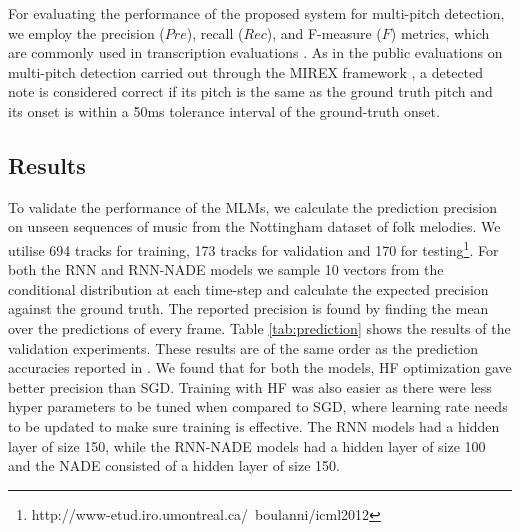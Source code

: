 For evaluating the performance of the proposed system for multi-pitch detection, we employ the precision ($\mathit{Pre}$), recall ($\mathit{Rec}$), and F-measure ($\mathit{F}$) metrics, which are commonly used in transcription evaluations \cite{MIREX}.
As in the public evaluations on multi-pitch detection carried out through the MIREX framework \cite{MIREX}, a detected note is considered correct if its pitch is the same as the ground truth pitch and its onset is within a 50ms tolerance interval of the ground-truth onset.

\subsection{Results}

To validate the performance of the MLMs, we calculate the prediction precision on unseen sequences of music from the Nottingham dataset of folk melodies. We utilise 694 tracks for training, 173 tracks for validation and 170 for testing\footnote{http://www-etud.iro.umontreal.ca/~boulanni/icml2012}. For both the RNN and RNN-NADE models we sample 10 vectors from the conditional distribution at each time-step and calculate the expected precision against the ground truth. The reported precision is found by finding the mean over the predictions of every frame. Table \ref{tab:prediction} shows the results of the validation experiments. These results are of the same order as the prediction accuracies reported in \cite{Boulanger-Lewandowski2012}. We found that for both the models, HF optimization gave better precision than SGD. Training with HF was also easier as there were less hyper parameters to be tuned when compared 
to SGD, where learning rate needs to be updated to make sure training is effective. The RNN models had a hidden layer of size 150, while the RNN-NADE models had a hidden layer of size 100 and the NADE consisted of a hidden layer of size 150. 

